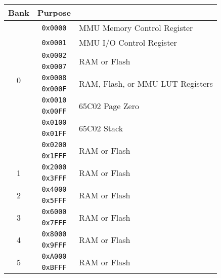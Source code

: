 \begin{table}[h]
    \begin{center}
        \begin{tabular}{|c|c|l|} \hline
            Bank & Purpose \\ \hline\hline
            \multirow{10}{*}{0} & \verb+0x0000+ & MMU Memory Control Register \\ \cline{2-3}
            & \verb+0x0001+ & MMU I/O Control Register \\ \cline{2-3}
            & \verb+0x0002+ & \multirow{2}{*}{RAM or Flash} \\ \cline{2-2}
            & \verb+0x0007+ & \\ \cline{2-3}
            & \verb+0x0008+ & \multirow{2}{*}{RAM, Flash, or MMU LUT Registers} \\ \cline{2-2}
            & \verb+0x000F+ & \\ \cline{2-3}
            & \verb+0x0010+ & \multirow{2}{*}{65C02 Page Zero} \\ \cline{2-2}
            & \verb+0x00FF+ & \\ \cline{2-3}
            & \verb+0x0100+ & \multirow{2}{*}{65C02 Stack} \\ \cline{2-2}
            & \verb+0x01FF+ & \\ \cline{2-3}
            & \verb+0x0200+ & \multirow{2}{*}{RAM or Flash} \\ \cline{2-2}
            & \verb+0x1FFF+ & \\ \hline
            \multirow{2}{*}{1} & \verb+0x2000+ & \multirow{2}{*}{RAM or Flash} \\ \cline{2-2}
            & \verb+0x3FFF+ & \\ \hline
            \multirow{2}{*}{2} & \verb+0x4000+ & \multirow{2}{*}{RAM or Flash} \\ \cline{2-2}
            & \verb+0x5FFF+ & \\ \hline
            \multirow{2}{*}{3} & \verb+0x6000+ & \multirow{2}{*}{RAM or Flash} \\ \cline{2-2}
            & \verb+0x7FFF+ & \\ \hline
            \multirow{2}{*}{4} & \verb+0x8000+ & \multirow{2}{*}{RAM or Flash} \\ \cline{2-2}
            & \verb+0x9FFF+ & \\ \hline
            \multirow{2}{*}{5} & \verb+0xA000+ & \multirow{2}{*}{RAM or Flash} \\ \cline{2-2}
            & \verb+0xBFFF+ & \\ \hline

\end{tabular}
\end{center}
\end{table}
